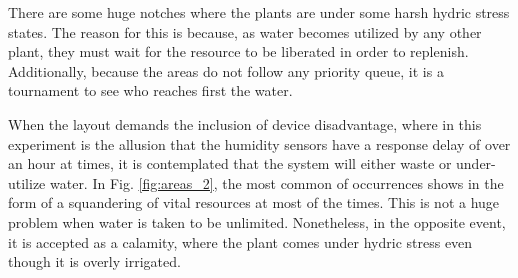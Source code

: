 \documentclass[12pt]{article}
\begin{document}
There are some huge notches where the plants are under some harsh hydric stress states. The reason for this is because, as water becomes utilized by any other plant, they must wait for the resource to be liberated in order to replenish. Additionally, because the areas do not follow any priority queue, it is a tournament to see who reaches first the water.

When the layout demands the inclusion of device disadvantage, where in this experiment is the allusion that the humidity sensors have a response delay of over an hour at times, it is contemplated that the system will either waste or under-utilize water. In Fig. \ref{fig:areas_2}, the most common of occurrences shows in the form of a squandering of vital resources at most of the times. This is not a huge problem when water is taken to be unlimited. Nonetheless, in the opposite event, it is accepted as a calamity, where the plant comes under hydric stress even though it is overly irrigated.
\end{document}
